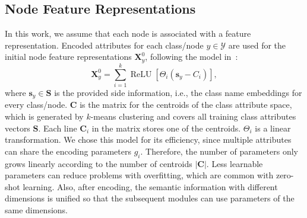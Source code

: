 \documentclass[letterpaper]{article} %
\DeclareMathOperator*{\relu}{ReLU}
\def\vs{{\bm{s}}}
\def\vx{{\bm{x}}}
\def\mC{{\bm{C}}}
\def\mP{{\bm{P}}}
\def\mS{{\bm{S}}}
\def\mX{{\bm{X}}}
\begin{document}
\subsection{Node Feature Representations}
In this work, we assume that each node is associated with a feature representation. Encoded attributes for each class/node $y\in\mathcal{Y}$ are used for the initial node feature representations $\mX_{y}^{0}$, following the model in~\cite{zhang2019co}:
\begin{equation}\label{equ:preprocess}
\mX^{0}_{y}= \sum_{i=1}^{k} \relu[\Theta_{i}(\vs_y-C_{i})],
\end{equation}
where $\vs_{y} \in \mS$ is the provided side information, i.e., the class name embeddings for every class/node. $\mC$ is the matrix for the centroids of the class attribute space, which is generated by $k$-means clustering and covers all training class attributes vectors $\mS$. Each line $\mC_{i}$ in the matrix stores one of the centroids. $\Theta_i$ is a linear transformation. We chose this model for its  efficiency, since multiple attributes can share the encoding parameters $g_i$. Therefore, the number of parameters only grows linearly according to the number of centroids $|\mC|$. Less learnable parameters can reduce problems with overfitting, which are common with zero-shot learning. Also, after encoding, the semantic information with different dimensions is unified so that the subsequent modules can use parameters of the same dimensions.


\end{document}
